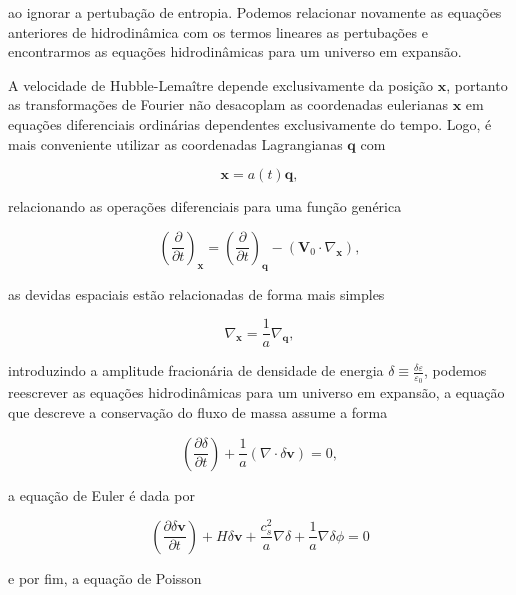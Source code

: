 ao ignorar a pertubação de entropia. Podemos relacionar novamente as equações anteriores de hidrodinâmica com os termos lineares as pertubações e encontrarmos as equações hidrodinâmicas para um universo em expansão.

A velocidade de Hubble-Lemaître depende exclusivamente da posição $ \mathbf{x} $, portanto as transformações de Fourier não desacoplam as coordenadas eulerianas $ \mathbf{x} $ em equações diferenciais ordinárias dependentes exclusivamente do tempo. Logo, é mais conveniente utilizar as coordenadas Lagrangianas $ \mathbf{q} $ com  

\begin{equation}\label{eq24}
	\mathbf{x} = a(t)\mathbf{q},
\end{equation}

relacionando as operações diferenciais para uma função genérica 

\begin{equation}\label{eq25}
	\left(\dfrac{\partial}{\partial t}\right)_\mathbf{x} = \left( \dfrac{\partial}{\partial t} \right)_\mathbf{q} - (\mathbf{V}_0 \cdot \nabla_\mathbf{x}),
\end{equation}
 
as devidas espaciais estão relacionadas de forma mais simples

\begin{equation}\label{eq26}
	\nabla_\mathbf{x} = \dfrac{1}{a}\nabla_\mathbf{q},
\end{equation}

 introduzindo a amplitude fracionária de densidade de energia $ \delta \equiv \frac{\delta\varepsilon}{\varepsilon_0} $, podemos reescrever as equações hidrodinâmicas para um universo em expansão, a equação que descreve a conservação do fluxo de massa assume a forma 
 
 \begin{equation}\label{eq27}
 	\left( \dfrac{\partial \delta}{\partial t} \right) + \dfrac{1}{a}(\nabla\cdot\delta\mathbf{v}) = 0,
 \end{equation}
 
a equação de Euler é dada por

\begin{equation}\label{eq28}
	\left( \dfrac{\partial \delta\mathbf{v}}{\partial t} \right) +H\delta\mathbf{v}+\dfrac{c^2_s}{a}\nabla\delta + \dfrac{1}{a}\nabla\delta\phi =0
\end{equation}

e por fim, a equação de Poisson

